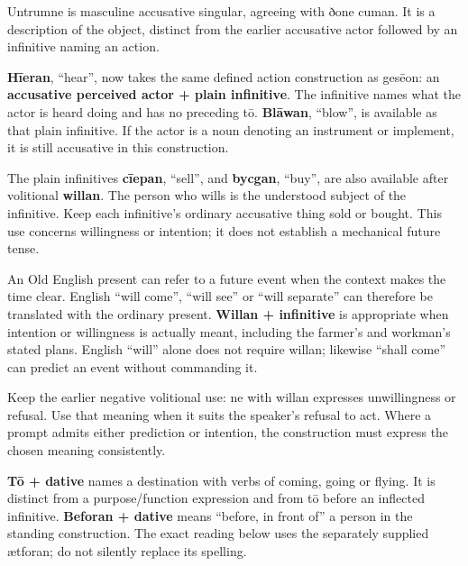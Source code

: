 Untrumne is masculine accusative singular, agreeing with ðone cuman. It is a description of the object, distinct from the earlier accusative actor followed by an infinitive naming an action.

\textbf{Hīeran}, “hear”, now takes the same defined action construction as gesēon: an \textbf{accusative perceived actor + plain infinitive}. The infinitive names what the actor is heard doing and has no preceding tō. \textbf{Blāwan}, “blow”, is available as that plain infinitive. If the actor is a noun denoting an instrument or implement, it is still accusative in this construction.

The plain infinitives \textbf{cīepan}, “sell”, and \textbf{bycgan}, “buy”, are also available after volitional \textbf{willan}. The person who wills is the understood subject of the infinitive. Keep each infinitive's ordinary accusative thing sold or bought. This use concerns willingness or intention; it does not establish a mechanical future tense.

An Old English present can refer to a future event when the context makes the time clear. English “will come”, “will see” or “will separate” can therefore be translated with the ordinary present. \textbf{Willan + infinitive} is appropriate when intention or willingness is actually meant, including the farmer's and workman's stated plans. English “will” alone does not require willan; likewise “shall come” can predict an event without commanding it.

Keep the earlier negative volitional use: ne with willan expresses unwillingness or refusal. Use that meaning when it suits the speaker's refusal to act. Where a prompt admits either prediction or intention, the construction must express the chosen meaning consistently.

\textbf{Tō + dative} names a destination with verbs of coming, going or flying. It is distinct from a purpose/\allowbreak{}function expression and from tō before an inflected infinitive. \textbf{Beforan + dative} means “before, in front of” a person in the standing construction. The exact reading below uses the separately supplied ætforan; do not silently replace its spelling.

